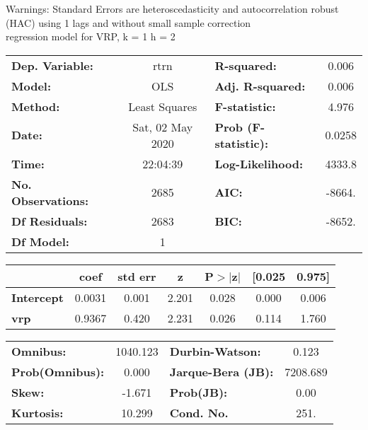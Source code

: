 Warnings: \newline
 [1] Standard Errors are heteroscedasticity and autocorrelation robust (HAC) using 1 lags and without small sample correction\\ 

regression model for VRP, k = 1 h = 2\begin{center}
\begin{tabular}{lclc}
\toprule
\textbf{Dep. Variable:}    &       rtrn       & \textbf{  R-squared:         } &     0.006   \\
\textbf{Model:}            &       OLS        & \textbf{  Adj. R-squared:    } &     0.006   \\
\textbf{Method:}           &  Least Squares   & \textbf{  F-statistic:       } &     4.976   \\
\textbf{Date:}             & Sat, 02 May 2020 & \textbf{  Prob (F-statistic):} &   0.0258    \\
\textbf{Time:}             &     22:04:39     & \textbf{  Log-Likelihood:    } &    4333.8   \\
\textbf{No. Observations:} &        2685      & \textbf{  AIC:               } &    -8664.   \\
\textbf{Df Residuals:}     &        2683      & \textbf{  BIC:               } &    -8652.   \\
\textbf{Df Model:}         &           1      & \textbf{                     } &             \\
\bottomrule
\end{tabular}
\begin{tabular}{lcccccc}
                   & \textbf{coef} & \textbf{std err} & \textbf{z} & \textbf{P$> |$z$|$} & \textbf{[0.025} & \textbf{0.975]}  \\
\midrule
\textbf{Intercept} &       0.0031  &        0.001     &     2.201  &         0.028        &        0.000    &        0.006     \\
\textbf{vrp}       &       0.9367  &        0.420     &     2.231  &         0.026        &        0.114    &        1.760     \\
\bottomrule
\end{tabular}
\begin{tabular}{lclc}
\textbf{Omnibus:}       & 1040.123 & \textbf{  Durbin-Watson:     } &    0.123  \\
\textbf{Prob(Omnibus):} &   0.000  & \textbf{  Jarque-Bera (JB):  } & 7208.689  \\
\textbf{Skew:}          &  -1.671  & \textbf{  Prob(JB):          } &     0.00  \\
\textbf{Kurtosis:}      &  10.299  & \textbf{  Cond. No.          } &     251.  \\
\bottomrule
\end{tabular}
\end{center}

